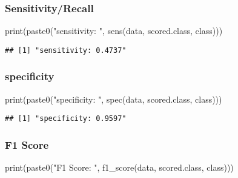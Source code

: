 \documentclass[
]{article}
\newenvironment{Shaded}{\begin{snugshade}}{\end{snugshade}}
\newcommand{\FunctionTok}[1]{\textcolor[rgb]{0.00,0.00,0.00}{#1}}
\newcommand{\NormalTok}[1]{#1}
\newcommand{\StringTok}[1]{\textcolor[rgb]{0.31,0.60,0.02}{#1}}
\begin{document}
\hypertarget{sensitivityrecall}{%
\subsubsection{Sensitivity/Recall}\label{sensitivityrecall}}

\begin{Shaded}
\begin{Highlighting}[]
\FunctionTok{print}\NormalTok{(}\FunctionTok{paste0}\NormalTok{(}\StringTok{"sensitivity: "}\NormalTok{, }\FunctionTok{sens}\NormalTok{(data, }\StringTok{\textquotesingle{}scored.class\textquotesingle{}}\NormalTok{, }\StringTok{\textquotesingle{}class\textquotesingle{}}\NormalTok{)))}
\end{Highlighting}
\end{Shaded}

\begin{verbatim}
## [1] "sensitivity: 0.4737"
\end{verbatim}

\hypertarget{specificity}{%
\subsubsection{specificity}\label{specificity}}

\begin{Shaded}
\begin{Highlighting}[]
\FunctionTok{print}\NormalTok{(}\FunctionTok{paste0}\NormalTok{(}\StringTok{"specificity: "}\NormalTok{, }\FunctionTok{spec}\NormalTok{(data, }\StringTok{\textquotesingle{}scored.class\textquotesingle{}}\NormalTok{, }\StringTok{\textquotesingle{}class\textquotesingle{}}\NormalTok{)))}
\end{Highlighting}
\end{Shaded}

\begin{verbatim}
## [1] "specificity: 0.9597"
\end{verbatim}

\hypertarget{f1-score}{%
\subsubsection{F1 Score}\label{f1-score}}

\begin{Shaded}
\begin{Highlighting}[]
\FunctionTok{print}\NormalTok{(}\FunctionTok{paste0}\NormalTok{(}\StringTok{"F1 Score: "}\NormalTok{, }\FunctionTok{f1\_score}\NormalTok{(data, }\StringTok{\textquotesingle{}scored.class\textquotesingle{}}\NormalTok{, }\StringTok{\textquotesingle{}class\textquotesingle{}}\NormalTok{)))}
\end{Highlighting}
\end{Shaded}
\end{document}
